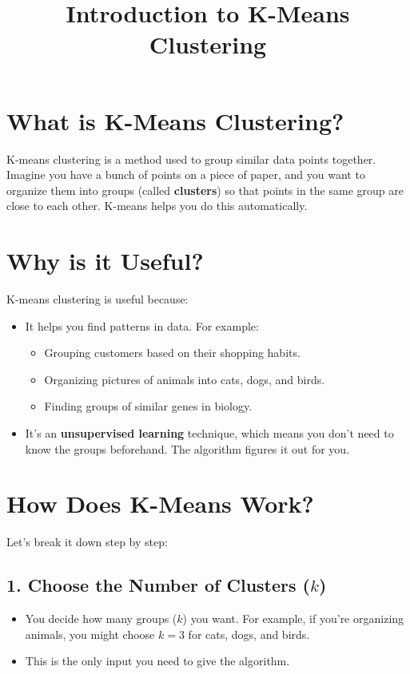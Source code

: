 \documentclass{article}
\title{Introduction to K-Means Clustering}
\author{}
\date{}
\begin{document}
	
	\maketitle
	
	\section{What is K-Means Clustering?}
	K-means clustering is a method used to group similar data points together. Imagine you have a bunch of points on a piece of paper, and you want to organize them into groups (called \textbf{clusters}) so that points in the same group are close to each other. K-means helps you do this automatically.
	
	\section{Why is it Useful?}
	K-means clustering is useful because:
	\begin{itemize}
		\item It helps you find patterns in data. For example:
		\begin{itemize}
			\item Grouping customers based on their shopping habits.
			\item Organizing pictures of animals into cats, dogs, and birds.
			\item Finding groups of similar genes in biology.
		\end{itemize}
		\item It’s an \textbf{unsupervised learning} technique, which means you don’t need to know the groups beforehand. The algorithm figures it out for you.
	\end{itemize}
	
	\section{How Does K-Means Work?}
	Let’s break it down step by step:
	
	\subsection{1. Choose the Number of Clusters (\( k \))}
	\begin{itemize}
		\item You decide how many groups (\( k \)) you want. For example, if you’re organizing animals, you might choose \( k = 3 \) for cats, dogs, and birds.
		\item This is the only input you need to give the algorithm.
	\end{itemize}
	
\end{document}
